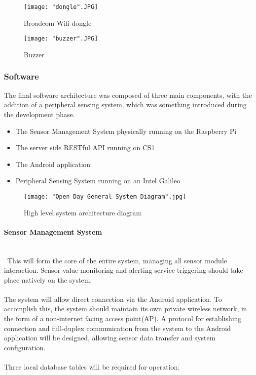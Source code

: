 \documentclass{article}
\begin{document}
\begin{figure}[H]
\centering
\texttt{[image: "dongle".JPG]}
\caption{Broadcom Wifi dongle}
\label{fig:hard_camera}
\end{figure}

\begin{figure}[H]
\centering
\texttt{[image: "buzzer".JPG]}
\caption{Buzzer}
\label{fig:hard_camera}
\end{figure}

\subsubsection{Software}
The final software architecture was composed of three main components, with the addition of a peripheral sensing system, which was something introduced during the development phase.

\begin{itemize}
  \item The Sensor Management System physically running on the Raspberry Pi
  \item The server side RESTful API running on CS1
  \item The Android application
  \item Peripheral Sensing System running on an Intel Galileo 
\end{itemize}

\begin{figure}[H]
\centering
\texttt{[image: "Open Day General System Diagram".jpg]}
\caption{High level system architecture diagram}
\label{overflow}
\end{figure}

\paragraph{Sensor Management System}
\noindent
\\\
This will form the core of the entire system, managing all sensor module interaction. Sensor value monitoring and alerting service triggering should take place natively on the system. \\\\ The system will allow direct connection via the Android application. To accomplish this, the system should maintain its own private wireless network, in the form of a non-internet facing access point(AP). A protocol for establishing connection and full-duplex communication from the system to the Android application will be designed, allowing sensor data transfer and system configuration. \\\\ 
Three local database tables will be required for operation:
\end{document}
